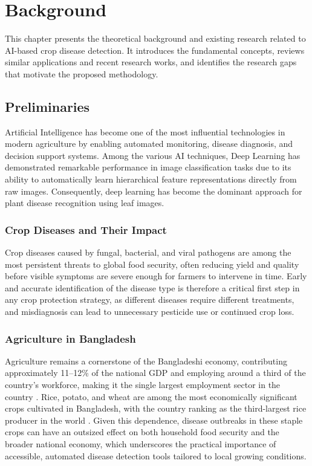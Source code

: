 \chapter{Background}
This chapter presents the theoretical background and existing research related to AI-based crop disease detection. It introduces the fundamental concepts, reviews similar applications and recent research works, and identifies the research gaps that motivate the proposed methodology.

\section{Preliminaries}

Artificial Intelligence has become one of the most influential technologies in modern agriculture by enabling automated monitoring, disease diagnosis, and decision support systems. Among the various AI techniques, Deep Learning has demonstrated remarkable performance in image classification tasks due to its ability to automatically learn hierarchical feature representations directly from raw images. Consequently, deep learning has become the dominant approach for plant disease recognition using leaf images.


\subsection{Crop Diseases and Their Impact}
Crop diseases caused by fungal, bacterial, and viral pathogens are among the most persistent threats to global food security, often reducing yield and quality before visible symptoms are severe enough for farmers to intervene in time. Early and accurate identification of the disease type is therefore a critical first step in any crop protection strategy, as different diseases require different treatments, and misdiagnosis can lead to unnecessary pesticide use or continued crop loss.
 
\subsection{Agriculture in Bangladesh}
Agriculture remains a cornerstone of the Bangladeshi economy, contributing approximately 11--12\% of the national GDP and employing around a third of the country's workforce, making it the single largest employment sector in the country \cite{worldbank_bd_agri}. Rice, potato, and wheat are among the most economically significant crops cultivated in Bangladesh, with the country ranking as the third-largest rice producer in the world \cite{agri_bd_wiki}. Given this dependence, disease outbreaks in these staple crops can have an outsized effect on both household food security and the broader national economy, which underscores the practical importance of accessible, automated disease detection tools tailored to local growing conditions.
 


